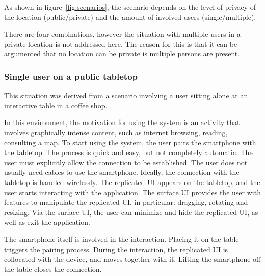 As shown in figure~\ref{fig:scenarios}, the scenario depends on the level of privacy of the location (public/private) and the amount of involved users (single/multiple).

There are four combinations, however the situation with multiple users in a private location is not addressed here.
The reason for this is that it can be argumented that no location can be private is multiple persons are present.

\subsubsection{Single user on a public tabletop}

This situation was derived from a scenario involving a user sitting alone at an interactive table in a coffee shop.

In this environment, the motivation for using the system is an activity that involves graphically intense content, such as 
internet browsing, reading, consulting a map.
To start using the system, the user pairs the smartphone with the tabletop.
The process is quick and easy, but not completely automatic.
The user must explicitly allow the connection to be established.
The user does not usually need cables to use the smartphone.
Ideally, the connection with the tabletop is handled wirelessly.
The replicated UI appears on the tabletop, and the user starts interacting with the application.
The surface UI provides the user with features to manipulate the replicated UI, in particular: dragging, rotating and resizing.
Via the surface UI, the user can minimize and hide the replicated UI, as well as exit the application.

The smartphone itself is involved in the interaction.
Placing it on the table triggers the pairing process.
During the interaction, the replicated UI is collocated with the device, and moves together with it.
Lifting the smartphone off the table closes the connection.


